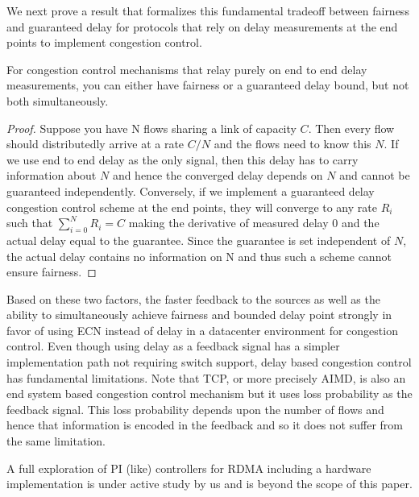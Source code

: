We next prove a result that formalizes this fundamental tradeoff between fairness
and guaranteed delay for protocols that rely on delay measurements at the end
points to implement congestion control.

\begin{thm}
\label{thm:fairness-delay}
For congestion control mechanisms that relay purely on end to end
delay measurements, you can either have fairness or a guaranteed delay
bound, but not both simultaneously.
\end{thm}
\begin{proof}
Suppose you have N flows sharing a link of capacity $C$. Then every flow
should distributedly arrive at a rate $C/N$ and the flows need to know
this $N$. If we use end to end delay as the only signal, then this delay
has to carry information about $N$ and hence the converged delay
depends on $N$ and cannot be guaranteed independently. Conversely, if we implement a guaranteed delay congestion
control scheme at the end points, they
will converge to any rate $R_i$ such that $\sum_{i=0}^{N}R_i = C$
making the derivative of measured delay 0 and the actual delay equal
to the guarantee. Since the guarantee is set independent of $N$, the
actual delay contains no information on N and 
thus such a scheme cannot ensure fairness.
\end{proof}

\noindent
Based on these two factors, the faster feedback to the sources as well
as the ability to simultaneously achieve fairness and bounded delay
point strongly in favor of using ECN instead of delay in a datacenter
environment for congestion control. Even though using delay as a
feedback signal has a simpler
implementation path not requiring switch support, delay based
congestion control has fundamental limitations. Note that TCP, or more
precisely AIMD, is also an end system based congestion control
mechanism but it uses loss probability as the feedback signal. This
loss probability depends upon the number of flows and hence that
information is encoded in the feedback and so it does not suffer from
the same limitation. 

A full exploration of PI (like)
controllers for RDMA including a hardware implementation is under
active study by us and is beyond the scope of this paper.
